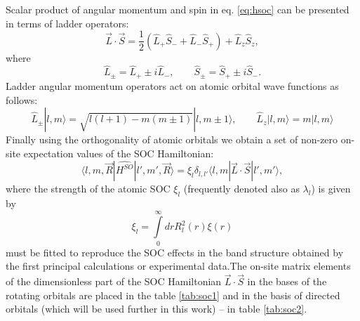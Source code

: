 Scalar product of angular momentum and spin in eq. \ref{eq:hsoc} can be presented in terms of ladder operators:
\begin{equation}
	\vec{L} \cdot \vec{S} = \frac{1}{2} (\hat{L}_{+} \hat{S}_{-} + \hat{L}_{-} \hat{S}_{+}) + \hat{L}_z \hat{S}_z,
\end{equation}
where
\begin{equation}
	\hat{L}_{\pm} = \hat{L}_{+} \pm i\hat{L}_{-},\qquad \hat{S}_{\pm} = \hat{S}_{+} \pm i\hat{S}_{-}.
\end{equation}
Ladder angular momentum operators act on atomic orbital wave functions as follows:
\begin{equation}
	\hat{L}_{\pm} |l, m \rangle = \sqrt{l(l+1) - m (m \pm 1)} |l, m \pm 1 \rangle, \qquad \hat{L}_z |l, m \rangle = m |l, m \rangle
\end{equation}
Finally using the orthogonality of atomic orbitals we obtain a set of non-zero on-site expectation values of the SOC Hamiltonian:
\begin{equation}
 	\langle l,m, \vec{R} | \hat{H^{SO}} | l', m', \vec{R} \rangle = \xi_l \delta_{l,l'} \langle l, m | \vec{L} \cdot \vec{S} | l', m' \rangle,
\end{equation} 
where the strength of the atomic SOC $\xi_l$ (frequently denoted also as $\lambda_l$) is given by 
\begin{equation}
	\xi_l = \int\limits^\infty_0 dr R^2_l(r) \xi(r)
\end{equation}
must be fitted to reproduce the SOC effects in the band structure obtained by the first principal calculations or experimental data.The on-site matrix elements of the dimensionless part of the SOC Hamiltonian $\vec{L} \cdot \vec{S} $ in the bases of the rotating orbitals are placed in the table \ref{tab:soc1} and in the basis of directed orbitals (which will be used further in this work) -- in table \ref{tab:soc2}.

